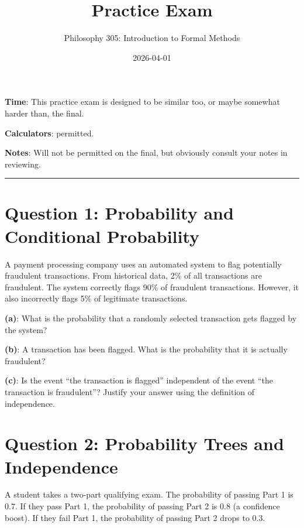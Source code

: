 \documentclass[
  english,
  11pt,
]{article}
\title{Practice Exam}
\author{Philosophy 305: Introduction to Formal Methods}
\date{2026-04-01}
\begin{document}
\maketitle


\textbf{Time}: This practice exam is designed to be similar too, or
maybe somewhat harder than, the final.

\textbf{Calculators}: permitted.

\textbf{Notes}: Will not be permitted on the final, but obviously
consult your notes in reviewing.

\bigskip
\hrule
\bigskip

\newpage

\section{Question 1: Probability and Conditional
Probability}\label{question-1-probability-and-conditional-probability}

A payment processing company uses an automated system to flag
potentially fraudulent transactions. From historical data, 2\% of all
transactions are fraudulent. The system correctly flags 90\% of
fraudulent transactions. However, it also incorrectly flags 5\% of
legitimate transactions.

\textbf{(a)}: What is the probability that a randomly selected
transaction gets flagged by the system?

\vspace{5cm}

\textbf{(b)}: A transaction has been flagged. What is the probability
that it is actually fraudulent?

\vspace{5cm}

\textbf{(c)}: Is the event ``the transaction is flagged'' independent of
the event ``the transaction is fraudulent''? Justify your answer using
the definition of independence.

\newpage

\section{Question 2: Probability Trees and
Independence}\label{question-2-probability-trees-and-independence}

A student takes a two-part qualifying exam. The probability of passing
Part 1 is 0.7. If they pass Part 1, the probability of passing Part 2 is
0.8 (a confidence boost). If they fail Part 1, the probability of
passing Part 2 drops to 0.3.
\end{document}
